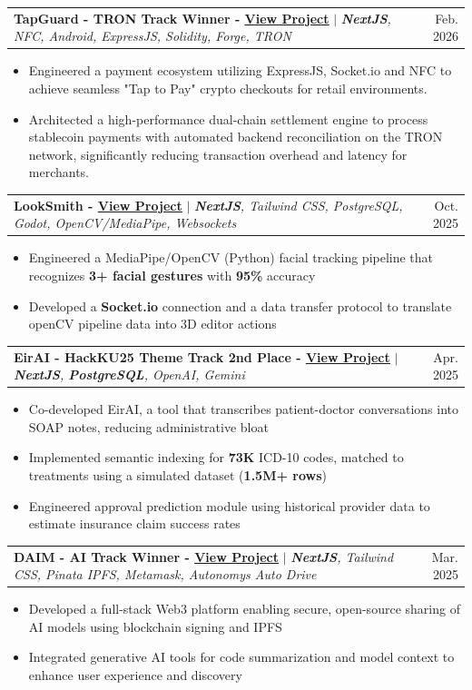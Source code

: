\documentclass[letterpaper,10.5pt]{article}
\makeatletter
\newcommand{\resumeItem}[1]{
  \item\small{
    {#1 \vspace{-2pt}}
  }
}
\newcommand{\resumeProjectHeading}[2]{
    \item
    \begin{tabular*}{0.97\textwidth}{l@{\extracolsep{\fill}}r}
      \small#1 & #2 \\
    \end{tabular*}\vspace{-7pt}
}
\newcommand{\resumeItemListStart}{\begin{itemize}}
\newcommand{\resumeItemListEnd}{\end{itemize}\vspace{-5pt}}
\makeatother
\begin{document}
    \resumeProjectHeading
          {\textbf{TapGuard - TRON Track Winner - \href{https://github.com/bhumikaguptaa/PennHack26}{\underline{View Project}}} $|$ \emph{\textbf{NextJS}, NFC, Android, ExpressJS, Solidity, Forge, TRON}}{Feb. 2026}
          \resumeItemListStart
           \resumeItem{Engineered a payment ecosystem utilizing ExpressJS, Socket.io and NFC to achieve seamless "Tap to Pay" crypto checkouts for retail environments.}
           \resumeItem{Architected a high-performance dual-chain settlement engine to process stablecoin payments with automated backend reconciliation on the TRON network, significantly reducing transaction overhead and latency for merchants.}
          \resumeItemListEnd
    \resumeProjectHeading
          {\textbf{LookSmith - \href{https://github.com/Vegito2367/LookSmith}{\underline{View Project}}} $|$ \emph{\textbf{NextJS}, Tailwind CSS, PostgreSQL, Godot, OpenCV/MediaPipe, Websockets}}{Oct. 2025}
          \resumeItemListStart
            \resumeItem{Engineered a MediaPipe/OpenCV (Python) facial tracking pipeline that recognizes \textbf{3+ facial gestures} with \textbf{95\%} accuracy}
            \resumeItem{Developed a \textbf{Socket.io} connection and a data transfer protocol to translate openCV pipeline data into 3D editor actions}
          \resumeItemListEnd
    \resumeProjectHeading
          {\textbf{EirAI - HackKU25 Theme Track 2nd Place - \href{https://github.com/Vegito2367/DAIM}{\underline{View Project}}} $|$ \emph{\textbf{NextJS}, \textbf{PostgreSQL}, OpenAI, Gemini}}{Apr. 2025}
          \resumeItemListStart
            \resumeItem{Co-developed EirAI, a tool that transcribes patient-doctor conversations into SOAP notes, reducing administrative bloat}
            \resumeItem{Implemented semantic indexing for \textbf{73K} ICD-10 codes, matched to treatments using a simulated dataset (\textbf{1.5M+ rows})}
            \resumeItem{Engineered approval prediction module using historical provider data to estimate insurance claim success rates}
          \resumeItemListEnd
    \resumeProjectHeading
          {\textbf{DAIM - AI Track Winner - \href{https://github.com/Vegito2367/DAIM}{\underline{View Project}}} $|$ \emph{\textbf{NextJS}, Tailwind CSS, Pinata IPFS, Metamask, Autonomys Auto Drive}}{Mar. 2025}
          \resumeItemListStart
            \resumeItem{Developed a full-stack Web3 platform enabling secure, open-source sharing of AI models using blockchain signing and IPFS}
            \resumeItem{Integrated generative AI tools for code summarization and model context to enhance user experience and discovery}
          \resumeItemListEnd
\end{document}
